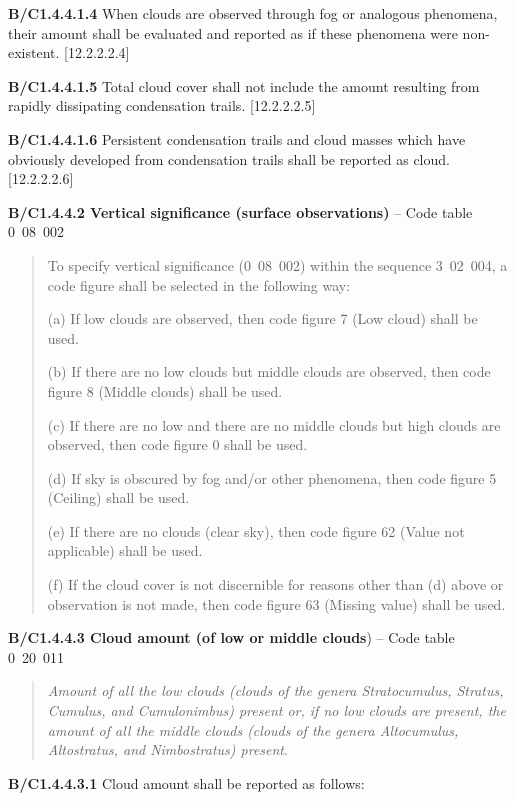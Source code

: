 \textbf{B/C1.4.4.1.4} When clouds are observed through fog or analogous phenomena, their amount shall be evaluated and reported as if these phenomena were non-existent. {[}12.2.2.2.4{]}

\textbf{B/C1.4.4.1.5} Total cloud cover shall not include the amount resulting from rapidly dissipating condensation trails. {[}12.2.2.2.5{]}

\textbf{B/C1.4.4.1.6} Persistent condensation trails and cloud masses which have obviously developed from condensation trails shall be reported as cloud. {[}12.2.2.2.6{]}

\textbf{B/C1.4.4.2 Vertical significance (surface observations)} -- Code table 0~08~002

\begin{quote}
To specify vertical significance (0~08~002) within the sequence 3~02~004, a code figure shall be selected in the following way:

(a) If low clouds are observed, then code figure 7 (Low cloud) shall be used.

(b) If there are no low clouds but middle clouds are observed, then code figure 8 (Middle clouds) shall be used.

(c) If there are no low and there are no middle clouds but high clouds are observed, then code figure 0 shall be used.

(d) If sky is obscured by fog and/or other phenomena, then code figure 5 (Ceiling) shall be used.

(e) If there are no clouds (clear sky), then code figure 62 (Value not applicable) shall be used.

(f) If the cloud cover is not discernible for reasons other than (d) above or observation is not made, then code figure 63 (Missing value) shall be used.
\end{quote}

\textbf{B/C1.4.4.3 Cloud amount (of low or middle clouds}) -- Code table 0~20~011

\begin{quote}
\emph{Amount of all the low clouds (clouds of the genera Stratocumulus, Stratus, Cumulus, and Cumulonimbus) present or, if no low clouds are present, the amount of all the middle clouds (clouds of the genera Altocumulus, Altostratus, and Nimbostratus) present}.
\end{quote}

\textbf{B/C1.4.4.3.1} Cloud amount shall be reported as follows:

